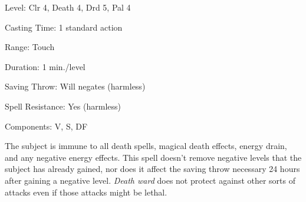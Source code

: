 
\begin{description*}
\item[Level:] Clr 4, Death 4, Drd 5, Pal 4
\item[Casting Time:] 1 standard action
\item[Range:] Touch
\item[Duration:] 1 min./level
\item[Saving Throw:] Will negates (harmless)
\item[Spell Resistance:] Yes (harmless)
\item[Components:] V, S, DF
\end{description*}

The subject is immune to all death spells, magical death effects, energy drain,
and any negative energy effects.
This spell doesn't remove negative levels that the subject has already gained,
nor does it affect the saving throw necessary 24 hours after gaining a negative
level.
\textit{Death ward} does not protect against other sorts of attacks even if those
attacks might be lethal.